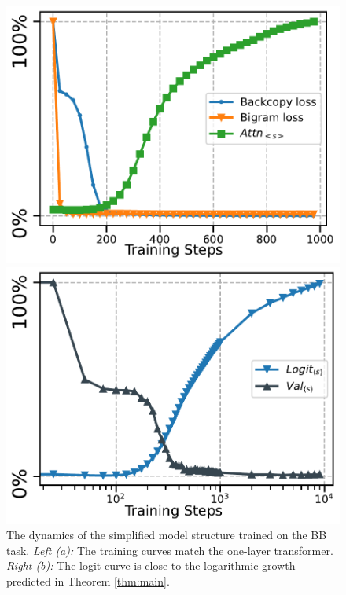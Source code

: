 \begin{figure}[t]
  \centering
  \begin{minipage}{0.3\textwidth}
      \centering
      \vspace{-.2em}
      \includegraphics[width=\linewidth]{Figures/BBM_appendix/simple_dynamics.pdf}
  \end{minipage}
  \begin{minipage}{0.3\textwidth}
      \centering
      \vspace{-.2em}
      \includegraphics[width=\linewidth]{Figures/BBM_appendix/simple_dynamics_logit.pdf}
  \end{minipage}
  \caption{\small The dynamics of the simplified model structure trained on the BB task. \textit{Left (a):} The training curves match the one-layer transformer. \textit{Right (b):} The logit curve is close to the logarithmic growth predicted in Theorem \ref{thm:main}.}
  \label{appfigure:simple-dynamic}
  \vspace{-1em}
\end{figure}

